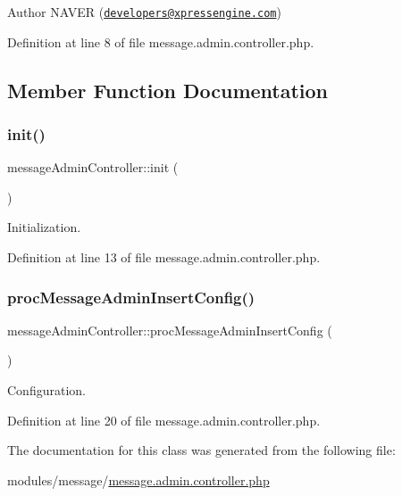 \begin{DoxyAuthor}{Author}
N\+A\+V\+ER (\href{mailto:developers@xpressengine.com}{\tt developers@xpressengine.\+com}) 
\end{DoxyAuthor}


Definition at line 8 of file message.\+admin.\+controller.\+php.



\subsection{Member Function Documentation}
\mbox{\label{classmessageAdminController_a926ccd4bc380531ba15d2df608416d1d}} 
\subsubsection{\texorpdfstring{init()}{init()}}
{\footnotesize\ttfamily message\+Admin\+Controller\+::init (\begin{DoxyParamCaption}{ }\end{DoxyParamCaption})}



Initialization. 



Definition at line 13 of file message.\+admin.\+controller.\+php.

\mbox{\label{classmessageAdminController_aedd1f833e2dd057dc55eb062b0d8ce0d}} 
\subsubsection{\texorpdfstring{proc\+Message\+Admin\+Insert\+Config()}{procMessageAdminInsertConfig()}}
{\footnotesize\ttfamily message\+Admin\+Controller\+::proc\+Message\+Admin\+Insert\+Config (\begin{DoxyParamCaption}{ }\end{DoxyParamCaption})}



Configuration. 



Definition at line 20 of file message.\+admin.\+controller.\+php.



The documentation for this class was generated from the following file\+:\begin{DoxyCompactItemize}
\item 
modules/message/\hyperlink{message_8admin_8controller_8php}{message.\+admin.\+controller.\+php}\end{DoxyCompactItemize}
